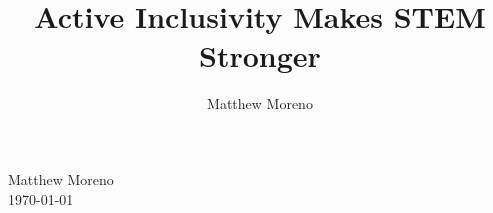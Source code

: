 \documentclass[12pt]{article}
\title{Active Inclusivity Makes STEM Stronger}\let\Title\@title
\author{Matthew Moreno}
\begin{document}
\begin{flushleft}

Matthew Moreno \\
\today


\begin{center}
\Title 
\end{center}


\setlength{\parindent}{0.5in}



\end{flushleft}
\end{document}
